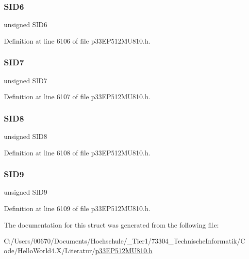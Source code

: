 \subsubsection{\texorpdfstring{S\+I\+D6}{SID6}}
{\footnotesize\ttfamily unsigned S\+I\+D6}



Definition at line 6106 of file p33\+E\+P512\+M\+U810.\+h.

\mbox{\label{structtag_c2_r_x_m2_s_i_d_b_i_t_s_a34097fb76decd431701fa2d86a22328e}} 
\subsubsection{\texorpdfstring{S\+I\+D7}{SID7}}
{\footnotesize\ttfamily unsigned S\+I\+D7}



Definition at line 6107 of file p33\+E\+P512\+M\+U810.\+h.

\mbox{\label{structtag_c2_r_x_m2_s_i_d_b_i_t_s_afe74894633244fdb0b0c01b4e8c522e7}} 
\subsubsection{\texorpdfstring{S\+I\+D8}{SID8}}
{\footnotesize\ttfamily unsigned S\+I\+D8}



Definition at line 6108 of file p33\+E\+P512\+M\+U810.\+h.

\mbox{\label{structtag_c2_r_x_m2_s_i_d_b_i_t_s_a33587704948067005c2a6a3ccc503c99}} 
\subsubsection{\texorpdfstring{S\+I\+D9}{SID9}}
{\footnotesize\ttfamily unsigned S\+I\+D9}



Definition at line 6109 of file p33\+E\+P512\+M\+U810.\+h.



The documentation for this struct was generated from the following file\+:\begin{DoxyCompactItemize}
\item 
C\+:/\+Users/00670/\+Documents/\+Hochschule/\+\_\+\+Tier1/73304\+\_\+\+Technische\+Informatik/\+Code/\+Hello\+World4.\+X/\+Literatur/\hyperlink{p33_e_p512_m_u810_8h}{p33\+E\+P512\+M\+U810.\+h}\end{DoxyCompactItemize}
